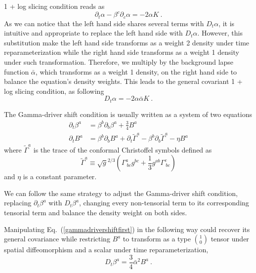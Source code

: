 1 + log slicing condition reads as
\begin{equation}\label{1 + log slicing}
\partial_{t}\alpha - \beta^{c}\partial_{c}\alpha = -2\alpha K \ .
\end{equation}
As we can notice that the left hand side shares several terms with $D_{t}\alpha$, it is intuitive and appropriate to replace the left hand side with $D_{t}\alpha$. However, this substitution make the left hand side transforms as a weight 2 density under time reparameterization while the right hand side transforms as a weight 1 density under such transformation. Therefore, we multiply by the background lapse function ${\bar \alpha}$, which transforms as a weight 1 density, on the right hand side to balance the equation's density weights. This leads to the general covariant 1 + log slicing condition, as following
\begin{equation}\label{covariant 1 + log slicing}
D_{t}\alpha = -2\alpha{\bar \alpha}K \ .
\end{equation}

The Gamma-driver shift condition is usually written as a system of two equations
\begin{subequations}\label{gammadrivershiftset}
\begin{align}
\partial_{t}\beta^{a} & = \beta^{b}\partial_{b}\beta^{a} + \frac{3}{4}B^{a}\label{gammadrivershiftfirst}\\
\partial_{t}B^{a} & = \beta^{b}\partial_{b}B^{a} + \partial_{t}{\tilde \Gamma}^{a} - \beta^{b}\partial_{b}{\tilde \Gamma}^{a} - \eta B^{a}\label{gammadrivershiftsecond}
\end{align}
\end{subequations}
where ${\tilde \Gamma}^{a}$ is the trace of the conformal Christoffel symbols defined as
\begin{equation}
{\tilde \Gamma}^{a} \equiv \sqrt{g}^{2/3}\left(\Gamma^{a}_{~bc}g^{bc} + \frac{1}{3}g^{ab}\Gamma^{c}_{~bc}\right)
\end{equation}
and $\eta$ is a constant parameter. 

We can follow the same strategy to adjust the Gamma-driver shift condition, replacing $\partial_{t}\beta^{a}$ with $D_{t}\beta^{a}$, changing every non-tensorial term to its corresponding tensorial term and balance the density weight on both sides. 

Manipulating Eq.~(\ref{gammadrivershiftfirst}) in the following way could recover its general covariance while restricting $B^{a}$ to transform as a type $1 \choose 0$ tensor under spatial diffeomorphism and a scalar under time reparameterization, 
\begin{equation}\label{gammadrivershiftfirstcovariant}
	D_{t}\beta^{a} = \frac{3}{4}{\bar \alpha}^{2}B^{a} \ .
\end{equation}

